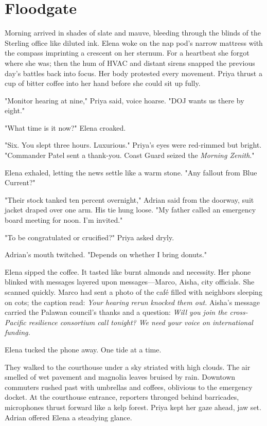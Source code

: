 \chapter{Floodgate}

Morning arrived in shades of slate and mauve, bleeding through the blinds of the Sterling office like diluted ink. Elena woke on the nap pod's narrow mattress with the compass imprinting a crescent on her sternum. For a heartbeat she forgot where she was; then the hum of HVAC and distant sirens snapped the previous day's battles back into focus. Her body protested every movement. Priya thrust a cup of bitter coffee into her hand before she could sit up fully.

"Monitor hearing at nine," Priya said, voice hoarse. "DOJ wants us there by eight."

"What time is it now?" Elena croaked.

"Six. You slept three hours. Luxurious." Priya's eyes were red-rimmed but bright. "Commander Patel sent a thank-you. Coast Guard seized the \textit{Morning Zenith}."

Elena exhaled, letting the news settle like a warm stone. "Any fallout from Blue Current?"

"Their stock tanked ten percent overnight," Adrian said from the doorway, suit jacket draped over one arm. His tie hung loose. "My father called an emergency board meeting for noon. I'm invited."

"To be congratulated or crucified?" Priya asked dryly.

Adrian's mouth twitched. "Depends on whether I bring donuts."

Elena sipped the coffee. It tasted like burnt almonds and necessity. Her phone blinked with messages layered upon messages—Marco, Aisha, city officials. She scanned quickly. Marco had sent a photo of the café filled with neighbors sleeping on cots; the caption read: \textit{Your hearing rerun knocked them out.} Aisha's message carried the Palawan council's thanks and a question: \textit{Will you join the cross-Pacific resilience consortium call tonight? We need your voice on international funding.}

Elena tucked the phone away. One tide at a time.

They walked to the courthouse under a sky striated with high clouds. The air smelled of wet pavement and magnolia leaves bruised by rain. Downtown commuters rushed past with umbrellas and coffees, oblivious to the emergency docket. At the courthouse entrance, reporters thronged behind barricades, microphones thrust forward like a kelp forest. Priya kept her gaze ahead, jaw set. Adrian offered Elena a steadying glance.

